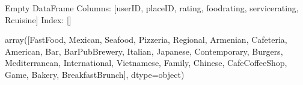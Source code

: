 \documentclass[letterpaper,10pt,english]{jupyterBook}
\begin{document}
\begin{sphinxVerbatim}[commandchars=\\\{\}]
\PYG{p}{[}\PYG{p}{]}
\end{sphinxVerbatim}

\begin{sphinxVerbatim}[commandchars=\\\{\}]
Empty DataFrame
Columns: [userID, placeID, rating, food\PYGZus{}rating, service\PYGZus{}rating, Rcuisine]
Index: []
\end{sphinxVerbatim}

\begin{sphinxVerbatim}[commandchars=\\\{\}]
\end{sphinxVerbatim}

\begin{sphinxVerbatim}[commandchars=\\\{\}]
array([\PYGZsq{}Fast\PYGZus{}Food\PYGZsq{}, \PYGZsq{}Mexican\PYGZsq{}, \PYGZsq{}Seafood\PYGZsq{}, \PYGZsq{}Pizzeria\PYGZsq{}, \PYGZsq{}Regional\PYGZsq{},
       \PYGZsq{}Armenian\PYGZsq{}, \PYGZsq{}Cafeteria\PYGZsq{}, \PYGZsq{}American\PYGZsq{}, \PYGZsq{}Bar\PYGZsq{}, \PYGZsq{}Bar\PYGZus{}Pub\PYGZus{}Brewery\PYGZsq{},
       \PYGZsq{}Italian\PYGZsq{}, \PYGZsq{}Japanese\PYGZsq{}, \PYGZsq{}Contemporary\PYGZsq{}, \PYGZsq{}Burgers\PYGZsq{}, \PYGZsq{}Mediterranean\PYGZsq{},
       \PYGZsq{}International\PYGZsq{}, \PYGZsq{}Vietnamese\PYGZsq{}, \PYGZsq{}Family\PYGZsq{}, \PYGZsq{}Chinese\PYGZsq{},
       \PYGZsq{}Cafe\PYGZhy{}Coffee\PYGZus{}Shop\PYGZsq{}, \PYGZsq{}Game\PYGZsq{}, \PYGZsq{}Bakery\PYGZsq{}, \PYGZsq{}Breakfast\PYGZhy{}Brunch\PYGZsq{}],
      dtype=object)
\end{sphinxVerbatim}

\begin{sphinxVerbatim}[commandchars=\\\{\}]
\PYG{p}{[}\PYG{p}{]}\PYG{p}{[}\PYG{p}{[}  \PYG{p}{]}\PYG{p}{]}
\end{sphinxVerbatim}
\end{document}
